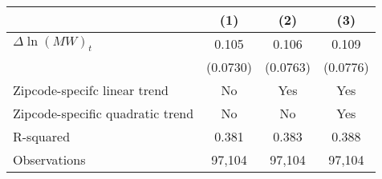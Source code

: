 {
\def\sym#1{\ifmmode^{#1}\else\(^{#1}\)\fi}
\begin{tabular}{l*{3}{c}}
\hline\hline
          &\multicolumn{1}{c}{(1)}         &\multicolumn{1}{c}{(2)}         &\multicolumn{1}{c}{(3)}         \\
\hline
$\Delta \ln(MW)_{t}$&    0.105         &    0.106         &    0.109         \\
          & (0.0730)         & (0.0763)         & (0.0776)         \\
\hline
Zipcode-specifc linear trend&       No         &      Yes         &      Yes         \\
Zipcode-specific quadratic trend&       No         &       No         &      Yes         \\
R-squared &    0.381         &    0.383         &    0.388         \\
Observations&   97,104         &   97,104         &   97,104         \\
\hline\hline
\end{tabular}
}
